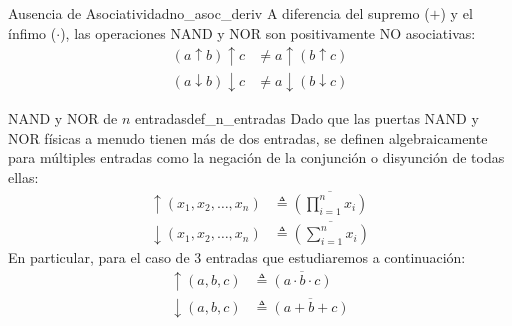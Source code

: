 \begin{teorema}{Ausencia de Asociatividad}{no_asoc_deriv}
A diferencia del supremo ($+$) y el ínfimo ($\cdot$), las operaciones NAND y NOR son positivamente NO asociativas:
\begin{align*}
    (a \uparrow b) \uparrow c &\neq a \uparrow (b \uparrow c) \\
    (a \downarrow b) \downarrow c &\neq a \downarrow (b \downarrow c)
\end{align*}
\end{teorema}

\begin{definicion}{NAND y NOR de $n$ entradas}{def_n_entradas}
Dado que las puertas NAND y NOR físicas a menudo tienen más de dos entradas, se definen algebraicamente para múltiples entradas como la negación de la conjunción o disyunción de todas ellas:
\begin{align*}
    \uparrow(x_1, x_2, \dots, x_n) &\triangleq \overline{\left( \prod_{i=1}^n x_i \right)} \\
    \downarrow(x_1, x_2, \dots, x_n) &\triangleq \overline{\left( \sum_{i=1}^n x_i \right)}
\end{align*}
En particular, para el caso de 3 entradas que estudiaremos a continuación:
\begin{align*}
    \uparrow(a,b,c) &\triangleq \overline{(a \cdot b \cdot c)} \\
    \downarrow(a,b,c) &\triangleq \overline{(a + b + c)}
\end{align*}
\end{definicion}

